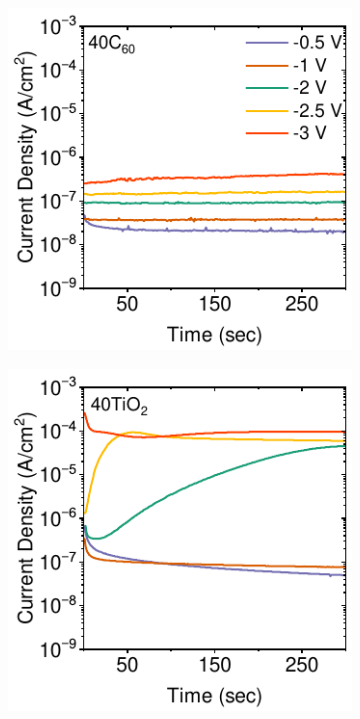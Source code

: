 \begin{figure}[htbp]
    \begin{subfigure}[b]{0.32\textwidth}
        \centering
        \includegraphics[width=\textwidth]{chapters/transport_layers/images/StaticJV_40C60.pdf}
        \caption{}
    \end{subfigure}
    \hfill
    \begin{subfigure}[b]{0.32\textwidth}
        \centering
        \includegraphics[width=\textwidth]{chapters/transport_layers/images/StaticJV_40TiO2.pdf}

\end{subfigure}
\end{figure}
